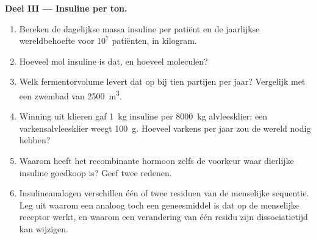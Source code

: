\begin{problem}
\medskip
\noindent\textbf{Deel III --- Insuline per ton.}
\begin{enumerate}[resume]
  \item Bereken de dagelijkse massa insuline per patiënt en de
        jaarlijkse wereldbehoefte voor $10^{7}$ patiënten, in
        kilogram.
  \item Hoeveel mol insuline is dat, en hoeveel moleculen?
  \item Welk fermentorvolume levert dat op bij tien partijen per jaar?
        Vergelijk met een zwembad van \qty{2500}{m^3}.
  \item Winning uit klieren gaf \qty{1}{kg} insuline per \qty{8000}{kg}
        alvleesklier; een varkensalvleesklier weegt \qty{100}{g}.
        Hoeveel varkens per jaar zou de wereld nodig hebben?
  \item Waarom heeft het recombinante hormoon zelfs de voorkeur waar
        dierlijke insuline goedkoop is? Geef twee redenen.
  \item Insulineanalogen verschillen één of twee residuen van de
        menselijke sequentie. Leg uit waarom een analoog toch een
        geneesmiddel is dat op de menselijke receptor werkt, en waarom
        een verandering van één residu zijn dissociatietijd kan wijzigen.
\end{enumerate}


\end{problem}
